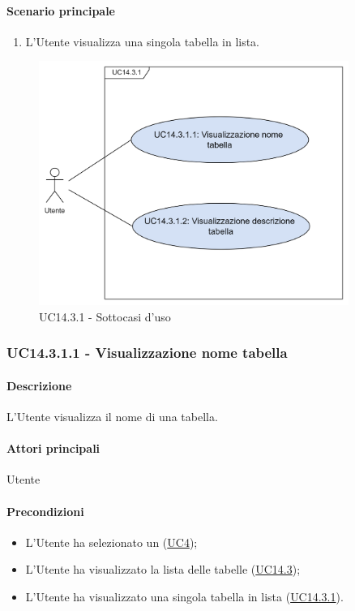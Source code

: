 \paragraph*{Scenario principale}
\begin{enumerate}
  \item L'Utente visualizza una singola tabella in lista.
\end{enumerate}

\begin{figure}[H]
  \centering
  \includegraphics[width=0.90\textwidth]{assets/uc14_3_1_1.png}
  \caption{UC14.3.1 - Sottocasi d'uso}
\end{figure}


\subsubsection{UC14.3.1.1 - Visualizzazione nome tabella}\label{UC14point3point1point1}
\paragraph*{Descrizione}
L'Utente visualizza il nome di una tabella.

\paragraph*{Attori principali}
Utente

\paragraph*{Precondizioni}
\begin{itemize}
  \item L'Utente ha selezionato un  (\hyperref[UC4]{UC4});
  \item L'Utente ha visualizzato la lista delle tabelle (\hyperref[UC14point3]{UC14.3});
  \item L'Utente ha visualizzato una singola tabella in lista (\hyperref[UC14point3point1]{UC14.3.1}).
\end{itemize}

